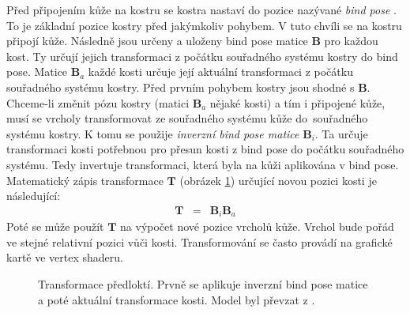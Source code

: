 Před připojením kůže na kostru se kostra nastaví do pozice nazývané \textit{bind pose} \cite{bindPose}. To je základní pozice kostry před jakýmkoliv pohybem. V tuto chvíli se na kostru připojí kůže. Následně jsou určeny a uloženy bind pose matice $\mathbf{B}$ pro každou kost. Ty určují jejich transformaci z počátku souřadného systému kostry do bind pose. Matice $\mathbf{B}_a$ každé kosti určuje její aktuální transformaci z počátku souřadného systému kostry. Před prvním pohybem kostry jsou shodné s $\mathbf{B}$. Chceme-li změnit pózu kostry (matici $\mathbf{B}_a$ nějaké kosti) a tím i připojené kůže, musí se vrcholy transformovat ze souřadného systému kůže do~souřadného systému kostry. K tomu se použije \textit{inverzní bind pose matice} $\mathbf{B}_i$. Ta určuje transformaci kosti potřebnou pro přesun kosti z bind pose do počátku souřadného systému. Tedy invertuje transformaci, která byla na kůži aplikována v bind pose. Matematický zápis transformace $\mathbf{T}$ (obrázek \ref{transform_pose}) určující novou pozici kosti je následující:
\begin{eqnarray}
\mathbf{T} &=& \mathbf{B}_i \mathbf{B}_a\label{r.transform_mat}
\end{eqnarray}
Poté se může použít $\mathbf{T}$ na výpočet nové pozice vrcholů kůže. Vrchol bude pořád ve stejné relativní pozici vůči kosti. Transformování se často provádí na grafické kartě ve vertex shaderu.
 \begin{figure}[h]
\begin{center}
\caption{Transformace předloktí. Prvně se aplikuje inverzní bind pose matice a poté aktuální transformace kosti. Model byl převzat z \cite{venom}.} \label{transform_pose}
\end{center}
\end{figure}
